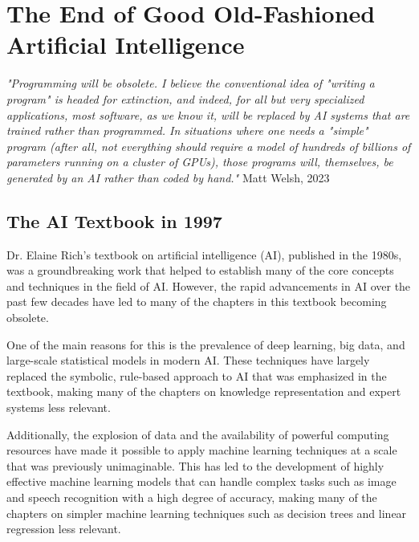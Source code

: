 \setchapterpreamble[u]{\margintoc}
\chapter{The End of Good Old-Fashioned Artificial Intelligence}

\textit{"Programming will be obsolete. I believe the conventional idea of "writing a program" is headed for extinction, and indeed, for all but very specialized applications, most software, as we know it, will be replaced by AI systems that are trained rather than programmed. In situations where one needs a "simple" program (after all, not everything should require a model of hundreds of billions of parameters running on a cluster of GPUs), those programs will, themselves, be generated by an AI rather than coded by hand."} Matt Welsh, 2023 \cite{welsh2023}

\section{The AI Textbook in 1997}

Dr. Elaine Rich's textbook on artificial intelligence (AI), published in the 1980s, was a groundbreaking work that helped to establish many of the core concepts and techniques in the field of AI. However, the rapid advancements in AI over the past few decades have led to many of the chapters in this textbook becoming obsolete.

One of the main reasons for this is the prevalence of deep learning, big data, and large-scale statistical models in modern AI. These techniques have largely replaced the symbolic, rule-based approach to AI that was emphasized in the textbook, making many of the chapters on knowledge representation and expert systems less relevant.

Additionally, the explosion of data and the availability of powerful computing resources have made it possible to apply machine learning techniques at a scale that was previously unimaginable. This has led to the development of highly effective machine learning models that can handle complex tasks such as image and speech recognition with a high degree of accuracy, making many of the chapters on simpler machine learning techniques such as decision trees and linear regression less relevant.  



